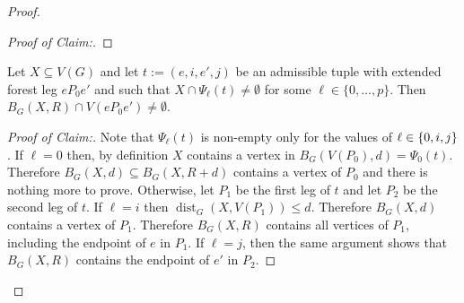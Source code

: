 \documentclass{patmorin}
\newcommand{\pat}[1]{\textcolor{Blue}{Pat: #1}}
\newenvironment{clmproof}{\begin{proof}[Proof of Claim:]\renewcommand{\qedsymbol}{\rule{1ex}{1ex}}}{\end{proof}}
\DeclareMathOperator{\dist}{dist}
\DeclarePairedDelimiter\set{\{}{\}}
\begin{document}
\begin{proof}
\begin{clmproof}
\end{clmproof}


\begin{clm}\label{hungarians_hit}
  Let $X\subseteq V(G)$ and let $t:=(e,i,e',j)$ be an admissible tuple with extended forest leg $eP_0e'$ and such that $X\cap \Psi_\ell(t)\neq\emptyset$ for some $\ell\in\{0,\ldots,p\}$.  Then $B_G(X,R)\cap V(eP_0e')\neq\emptyset$.
\end{clm}

\begin{clmproof}
  Note that $\Psi_{\ell}(t)$ is non-empty only for the values of $\ell\in\set{0,i,j}$. 
  If $\ell=0$ then, by definition $X$ contains a vertex in $B_G(V(P_0),d)=\Psi_0(t)$.  Therefore $B_G(X,d)\subseteq B_G(X,R+d)$ contains a vertex of $P_0$ and there is nothing more to prove.
  Otherwise, let $P_1$ be the first leg of $t$ and let $P_2$ be the second leg of $t$.
  If $\ell=i$ then $\dist_G(X,V(P_1))\le d$.  Therefore $B_G(X,d)$ contains a vertex of $P_1$.  Therefore $B_G(X,R)$ contains all vertices of $P_1$, including the endpoint of $e$ in $P_1$.  If $\ell=j$, then the same argument shows that $B_G(X,R)$ contains the endpoint of $e'$ in $P_2$.
\end{clmproof}


\end{proof}
\end{document}
